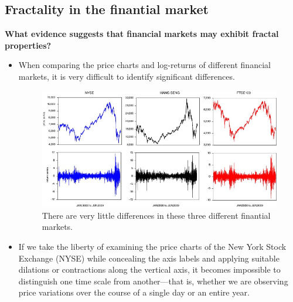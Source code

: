 \subsection{Fractality in the finantial market}
\textbf{What evidence suggests that financial markets may exhibit fractal properties?}
\begin{itemize}
    \item When comparing the price charts and log-returns of different financial markets, it is very difficult to identify significant differences.
    \begin{figure} [H]
        \centering
        \includegraphics[width=1\linewidth]{img/fractal_1.png}
        \caption{There are very little differences in these three different finantial markets.}
    \end{figure}
    \item If we take the liberty of examining the price charts of the New York Stock Exchange (NYSE) while concealing the axis labels and applying suitable dilations or contractions along the vertical axis, it becomes impossible to distinguish one time scale from another—that is, whether we are observing price variations over the course of a single day or an entire year.


\end{itemize}
